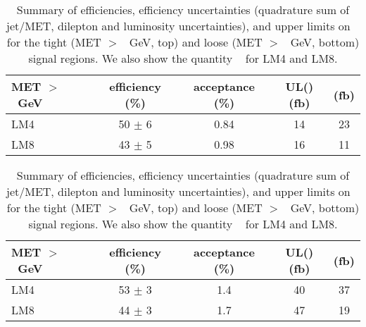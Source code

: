 \begin{table}[hbt]
  \begin{center}
	\caption{
	  \label{tab:models} 
	  Summary of efficiencies, efficiency uncertainties (quadrature sum
	  of jet/MET, dilepton and luminosity uncertainties), 
	  and upper limits on \sta\ %
	  for the tight (MET $>$ \signalmett~GeV, top)
	  and loose (MET $>$ \signalmetl~GeV, bottom) signal regions.
	  We also show the quantity
	  \sta\ %
	  for LM4 and LM8.}

	\medskip
	\begin{tabular}{l|cccc}
	  \hline
	  \bf MET $>$ \signalmett~GeV & efficiency (\%) & acceptance (\%) & UL(\sta)(fb) & \sta(fb) \\
	  \hline
	  LM4  &  50 $\pm$   6  &  0.84  &  14  &  23  \\
	  LM8  &  43 $\pm$   5  &  0.98  &  16  &  11  \\
	  \hline
	\end{tabular}

	\medskip
	\begin{tabular}{l|cccc}
	  \hline
	  \bf MET $>$ \signalmetl~GeV & efficiency (\%) & acceptance (\%) & UL(\sta)(fb) & \sta(fb) \\
	  \hline
	  LM4 &  53 $\pm$   3  &  1.4  &   40  &   37  \\
	  LM8 &  44 $\pm$   3  &  1.7  &   47  &   19  \\

	  \hline
	\end{tabular}

	\begin{comment}

	  \begin{tabular}{l|ccc}

		\hline
		& $t\bar{t}$    & LM4     & LM8       \\
		\hline
			{\bf Loose signal region}                &               &         &           \\
			Efficiency                               &       0.43    & 0.54    & 0.45      \\
			Efficiency Uncertainty                   &       0.15    & 0.12    & 0.12      \\
			UL($\sigma \times BF \times A$) (pb)     &       0.56    & 0.44    & 0.53      \\
			$\sigma \times BF \times A$ (pb)         &               & 0.045   & 0.025     \\


\end{comment}
\end{center}
\end{table}
